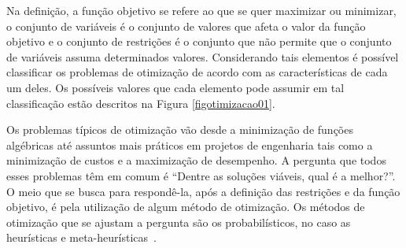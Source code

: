Na definição, a função objetivo se refere ao que se quer maximizar ou minimizar, o conjunto de variáveis é o conjunto de valores que afeta o valor da função objetivo e o conjunto de restrições é o conjunto que não permite que o conjunto de variáveis assuma determinados valores. Considerando tais elementos é possível classificar os problemas de otimização de acordo com as características de cada um deles. Os possíveis valores que cada elemento pode assumir em tal classificação estão descritos na Figura \ref{figotimizacao01}.

Os problemas típicos de otimização vão desde a minimização de funções algébricas até assuntos mais práticos em projetos de engenharia tais como a minimização de custos e a maximização de desempenho. A pergunta que todos esses problemas têm em comum é ``Dentre as soluções viáveis, qual é a melhor?''. O meio que se busca para respondê-la, após a definição das restrições e da função objetivo, é pela utilização de algum método de otimização. Os métodos de otimização que se ajustam a pergunta são os probabilísticos, no caso as heurísticas e meta-heurísticas~\cite{gandomi2013metaheuristic}.

